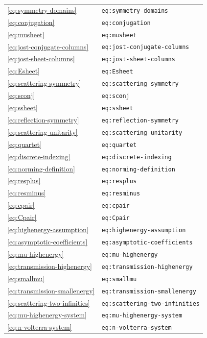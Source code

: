 \begin{longtable}{p{}p{}}
\eqref{eq:symmetry-domains} & \texttt{eq:symmetry-domains}\\
\eqref{eq:conjugation} & \texttt{eq:conjugation}\\
\eqref{eq:musheet} & \texttt{eq:musheet}\\
\eqref{eq:jost-conjugate-columns} & \texttt{eq:jost-conjugate-columns}\\
\eqref{eq:jost-sheet-columns} & \texttt{eq:jost-sheet-columns}\\
\eqref{eq:Esheet} & \texttt{eq:Esheet}\\
\eqref{eq:scattering-symmetry} & \texttt{eq:scattering-symmetry}\\
\eqref{eq:sconj} & \texttt{eq:sconj}\\
\eqref{eq:ssheet} & \texttt{eq:ssheet}\\
\eqref{eq:reflection-symmetry} & \texttt{eq:reflection-symmetry}\\
\eqref{eq:scattering-unitarity} & \texttt{eq:scattering-unitarity}\\
\eqref{eq:quartet} & \texttt{eq:quartet}\\
\eqref{eq:discrete-indexing} & \texttt{eq:discrete-indexing}\\
\eqref{eq:norming-definition} & \texttt{eq:norming-definition}\\
\eqref{eq:resplus} & \texttt{eq:resplus}\\
\eqref{eq:resminus} & \texttt{eq:resminus}\\
\eqref{eq:cpair} & \texttt{eq:cpair}\\
\eqref{eq:Cpair} & \texttt{eq:Cpair}\\
\eqref{eq:highenergy-assumption} & \texttt{eq:highenergy-assumption}\\
\eqref{eq:asymptotic-coefficients} & \texttt{eq:asymptotic-coefficients}\\
\eqref{eq:mu-highenergy} & \texttt{eq:mu-highenergy}\\
\eqref{eq:transmission-highenergy} & \texttt{eq:transmission-highenergy}\\
\eqref{eq:smallmu} & \texttt{eq:smallmu}\\
\eqref{eq:transmission-smallenergy} & \texttt{eq:transmission-smallenergy}\\
\eqref{eq:scattering-two-infinities} & \texttt{eq:scattering-two-infinities}\\
\eqref{eq:mu-highenergy-system} & \texttt{eq:mu-highenergy-system}\\
\eqref{eq:n-volterra-system} & \texttt{eq:n-volterra-system}\\

\end{longtable}
